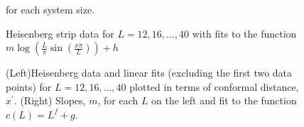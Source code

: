 \documentclass[prl,aps,twocolumn,floatfix,amsmath,amssymb,superscriptaddress,tightenlines]{revtex4}
\begin{document}

 \begin{figure}[ht]
   \begin{center}
   \end{center}
   \caption{Heisenberg strip data for $L=12,16,\dots,40$ with fits to the function $m\log(\tfrac{L}{\pi}\sin(\tfrac{x\pi}{L}))+h$} for each system size.
   \label{fig:heis_bow}
 \end{figure}

 \begin{figure}[ht]
   \begin{center}
   \end{center}
   \caption{(Left)Heisenberg data and linear fits (excluding the first two data points) for $L=12,16,\dots,40$ plotted in terms of conformal distance, $x^\prime$.
   (Right) Slopes, $m$, for each $L$ on the left {\color{red} and fit to the function $c(L)=L^f+g$}. 
   }
   \label{fig:heis_lines}
 \end{figure}
\end{document}
